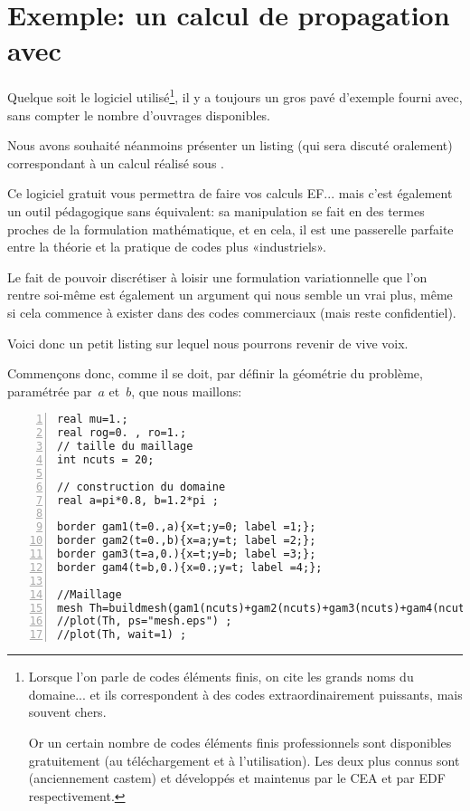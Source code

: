 \section{Exemple: un calcul de propagation avec \freefem}

\medskip
Quelque soit le logiciel utilisé\footnote{Lorsque l'on parle de codes éléments finis, on cite les grands noms du domaine... et ils correspondent à des codes extraordinairement puissants, mais souvent chers.

Or un certain nombre de codes éléments finis professionnels sont disponibles gratuitement (au téléchargement et à l'utilisation). Les deux plus connus sont \castem (anciennement castem) et \aster développés et maintenus par le CEA et par EDF respectivement.}, il y a toujours un gros pavé d'exemple fourni avec, sans compter le nombre d'ouvrages disponibles.

\medskip
Nous avons souhaité néanmoins présenter un listing (qui sera discuté oralement) correspondant à un calcul réalisé sous \freefem.

Ce logiciel gratuit vous permettra de faire vos calculs EF... mais c'est également un outil pédagogique sans équivalent: sa manipulation se fait en des termes proches de la formulation mathématique, et en cela, il est une passerelle parfaite entre la théorie et la pratique de codes plus «industriels».

Le fait de pouvoir discrétiser à loisir une formulation variationnelle que l'on rentre soi-même est également un argument qui nous semble un vrai plus, même si cela commence à exister dans des codes commerciaux (mais reste confidentiel).

\medskip
Voici donc un petit listing sur lequel nous pourrons revenir de vive voix.

Commençons donc, comme il se doit, par définir la géométrie du problème, paramétrée par~$a$ et~$b$, que nous maillons:

\medskip
\color{gris}\scriptsize
\begin{Verbatim}[numbers=left,numbersep=3pt]
real mu=1.; 
real rog=0. , ro=1.;
// taille du maillage
int ncuts = 20;

// construction du domaine
real a=pi*0.8, b=1.2*pi ; 

border gam1(t=0.,a){x=t;y=0; label =1;};
border gam2(t=0.,b){x=a;y=t; label =2;};
border gam3(t=a,0.){x=t;y=b; label =3;};
border gam4(t=b,0.){x=0.;y=t; label =4;};

//Maillage
mesh Th=buildmesh(gam1(ncuts)+gam2(ncuts)+gam3(ncuts)+gam4(ncuts)); 
//plot(Th, ps="mesh.eps") ;
//plot(Th, wait=1) ;
\end{Verbatim}
\color{black}\normalsize

